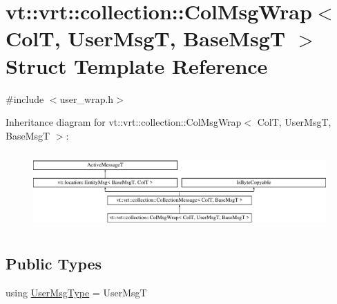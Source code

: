 \hypertarget{structvt_1_1vrt_1_1collection_1_1_col_msg_wrap}{}\section{vt\+:\+:vrt\+:\+:collection\+:\+:Col\+Msg\+Wrap$<$ ColT, User\+MsgT, Base\+MsgT $>$ Struct Template Reference}
\label{structvt_1_1vrt_1_1collection_1_1_col_msg_wrap}


{\ttfamily \#include $<$user\+\_\+wrap.\+h$>$}

Inheritance diagram for vt\+:\+:vrt\+:\+:collection\+:\+:Col\+Msg\+Wrap$<$ ColT, User\+MsgT, Base\+MsgT $>$\+:\begin{figure}[H]
\begin{center}
\leavevmode
\includegraphics[height=2.994652cm]{structvt_1_1vrt_1_1collection_1_1_col_msg_wrap}
\end{center}
\end{figure}
\subsection*{Public Types}
\begin{DoxyCompactItemize}
\item 
using \hyperlink{structvt_1_1vrt_1_1collection_1_1_col_msg_wrap_a168446c6b2feea3a003dbfa02f21e227}{User\+Msg\+Type} = User\+MsgT
\end{DoxyCompactItemize}
